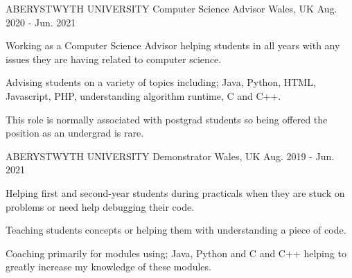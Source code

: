 

\begin{cventries}

  \cventry
    {ABERYSTWYTH UNIVERSITY} %
    {Computer Science Advisor} %
    {Wales, UK} %
    {Aug. 2020 - Jun. 2021} %
    {
      \begin{cvitems} %
        \item {Working as a Computer Science Advisor helping students in all years with any issues they are having related to computer science.}
        \item {Advising students on a variety of topics including; Java, Python, HTML, Javascript, PHP, understanding algorithm runtime, C and C++.}
        \item {This role is normally associated with postgrad students so being offered the position as an undergrad is rare.}
      \end{cvitems}
    }

  \cventry
    {ABERYSTWYTH UNIVERSITY} %
    {Demonstrator} %
    {Wales, UK} %
    {Aug. 2019 - Jun. 2021} %
    {
      \begin{cvitems} %
        \item {Helping first and second-year students during practicals when they are stuck on problems or need help debugging their code.}
        \item {Teaching students concepts or helping them with understanding a piece of code.}
        \item {Coaching primarily for modules using; Java, Python and C and C++ helping to greatly increase my knowledge of these modules.}
      \end{cvitems}
    }


\end{cventries}
